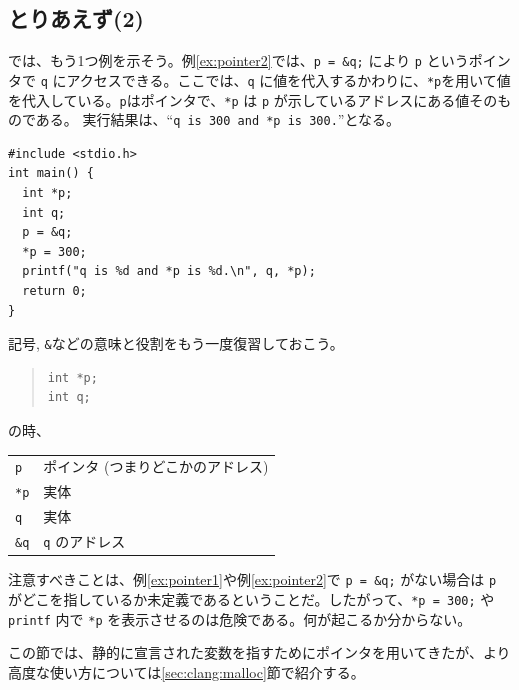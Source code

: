 \subsection{とりあえず(2)}
では、もう1つ例を示そう。例\ref{ex:pointer2}では、\verb|p = &q;| により \verb|p| というポインタで \verb|q| にアクセスできる。ここでは、\verb|q| に値を代入するかわりに、\verb|*p|を用いて値を代入している。\verb|p|はポインタで、\verb|*p| は \verb|p| が示しているアドレスにある値そのものである。
実行結果は、``{\tt q is 300 and *p is 300.}''となる。
%
\begin{reidai}\label{ex:pointer2}
\begin{verbatim}
#include <stdio.h>
int main() {
  int *p;
  int q;
  p = &q;
  *p = 300;
  printf("q is %d and *p is %d.\n", q, *p);
  return 0;
}
\end{verbatim}
\end{reidai} \noindent
%
記号{\tt *}, {\tt \&}などの意味と役割をもう一度復習しておこう。
%
\begin{quote}
\begin{verbatim}
int *p;
int q;
\end{verbatim}
\end{quote}
%
の時、
%
\begin{table}[H]
\begin{center}
\begin{tabular}{ll}
  \verb|p|  &ポインタ (つまりどこかのアドレス)\\
  \verb|*p| &実体\\
  \verb|q|  &実体\\
  \verb|&q| &\verb|q| のアドレス
\end{tabular}
\end{center}
\end{table} \noindent
%
注意すべきことは、例\ref{ex:pointer1}や例\ref{ex:pointer2}で \verb|p = &q;| がない場合は \verb|p| がどこを指しているか未定義であるということだ。したがって、\verb|*p = 300;| や \verb|printf| 内で \verb|*p| を表示させるのは危険である。何が起こるか分からない。

この節では、静的に宣言された変数を指すためにポインタを用いてきたが、より高度な使い方については\ref{sec:clang:malloc}節で紹介する。

